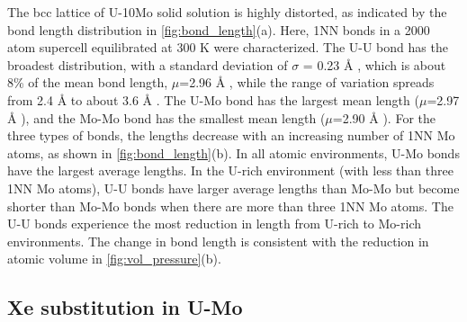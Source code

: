 \documentclass[review]{elsarticle}
\providecommand{\DIFaddtex}[1]{{\protect\color{blue} \sf #1}} %
\providecommand{\DIFaddend}{} %
\providecommand{\DIFadd}[1]{\texorpdfstring{\DIFaddtex{#1}}{#1}} %
\DeclareRobustCommand{\DIFaddend}{\DIFOaddend \let\includegraphics\DIFOincludegraphics} %
\begin{document}
\DIFadd{The bcc lattice of U-10Mo solid solution is highly distorted, as indicated by the bond length distribution in \cref{fig:bond_length}(a). Here, 1NN bonds in a 2000 atom supercell equilibrated at 300 K were characterized. The U-U bond has the broadest distribution, with a standard deviation of $\sigma$ = 0.23 }{\DIFadd{\AA}}\DIFadd{, which is about 8\% of the mean bond length, $\mu$=2.96 }{\DIFadd{\AA}}\DIFadd{, while the range of variation spreads from 2.4 }{\DIFadd{\AA}} \DIFadd{to about 3.6 }{\DIFadd{\AA}}\DIFadd{. The U-Mo bond has the largest mean length ($\mu$=2.97 }{\DIFadd{\AA}}\DIFadd{), and the Mo-Mo bond has the smallest mean length ($\mu$=2.90 }{\DIFadd{\AA}}\DIFadd{). For the three types of bonds, the lengths decrease with an increasing number of 1NN Mo atoms, as shown in \cref{fig:bond_length}(b). In all atomic environments, U-Mo bonds have the largest average lengths. In the U-rich environment (with less than three 1NN Mo atoms), U-U bonds have larger average lengths than Mo-Mo but become shorter than Mo-Mo bonds when there are more than three 1NN Mo atoms. The U-U bonds experience the most reduction in length from U-rich to Mo-rich environments. The change in bond length is consistent with the reduction in atomic volume in \cref{fig:vol_pressure}(b). 
}

\DIFaddend \subsection{Xe substitution in U-Mo}
\end{document}

